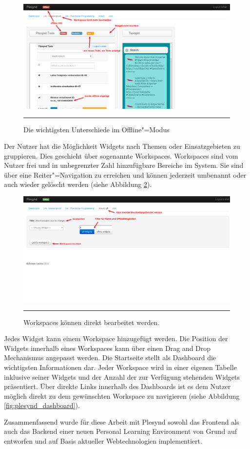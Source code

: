 \begin{figure}
  \centering
  \includegraphics[width=\textwidth,height=\textheight,keepaspectratio]{./Figures/plesynd_workspace_offline.png}
    \rule{35em}{0.5pt}
  \caption[Plesynd User"=Interface: Workspace Offline]{Die wichtigsten Unterschiede im Offline"=Modus}
  \label{fig:plesynd_workspace_offline}
\end{figure}
Der Nutzer hat die Möglichkeit Widgets nach Themen oder Einsatzgebieten zu gruppieren. Dies geschieht über sogenannte Workspaces. Workspaces sind vom Nutzer frei und in unbegrenzter Zahl hinzufügbare Bereiche im System. Sie sind über eine Reiter"=Navigation zu erreichen und können jederzeit umbenannt oder auch wieder gelöscht werden (siehe Abbildung \ref{fig:plesynd_workspace_edit}). 
\begin{figure}
  \centering
  \includegraphics[width=\textwidth,height=\textheight,keepaspectratio]{./Figures/plesynd_workspace_edit.png}
    \rule{35em}{0.5pt}
  \caption[Plesynd User"=Interface: Bearbeiten von Workspaces]{Workspaces können direkt bearbeitet werden.}
  \label{fig:plesynd_workspace_edit}
\end{figure}
Jedes Widget kann einem Workspace hinzugefügt werden. Die Position der Widgets innerhalb eines Workspaces kann über einen Drag and Drop Mechanismus angepasst werden. Die Startseite stellt als Dashboard die wichtigsten Informationen dar. Jeder Workspace wird in einer eigenen Tabelle inklusive seiner Widgets und der Anzahl der zur Verfügung stehenden Widgets präsentiert. Über direkte Links innerhalb des Dashboards ist es dem Nutzer möglich direkt zu dem gewünschten Workspace zu navigieren (siehe Abbildung \ref{fig:plesynd_dashboard}).

Zusammenfassend wurde für diese Arbeit mit Plesynd sowohl das Frontend als auch das Backend einer neuen Personal Learning Environment von Grund auf entworfen und auf Basis aktueller Webtechnologien implementiert.
